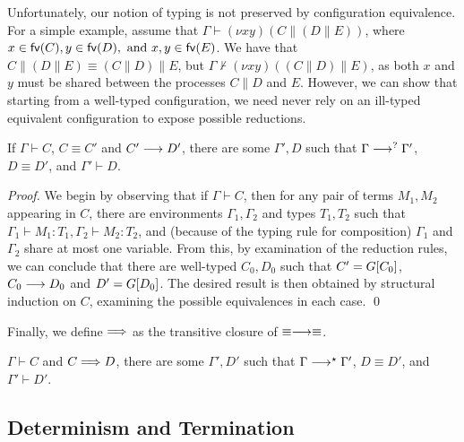 \documentclass[oribibl,orivec,envcountsame]{llncs}
\begin{document}
Unfortunately, our notion of typing is not preserved by configuration equivalence.  For a simple
example, assume that $\Gamma \vdash (\nu x y)(C \parallel (D \parallel E))$, where $x \in \mathsf{fv}(C), y
\in \mathsf{fv}(D), \text{ and } x,y \in \mathsf{fv}(E)$.  We have that $C \parallel (D \parallel E) \equiv
(C \parallel D) \parallel E$, but $\Gamma \nvdash (\nu x y)((C \parallel D) \parallel E)$, as both
$x$ and $y$ must be shared between the processes $C \parallel D$ and $E$.  However, we can show that
starting from a well-typed configuration, we need never rely on an ill-typed equivalent
configuration to expose possible reductions.
%
\begin{theorem}\label{thm:preservation-equiv}
  If $\Gamma \vdash C$, $C \equiv C'$ and $C' \longrightarrow D'$, there are some $\Gamma',D$ such that
  $\Gamma \longrightarrow^? \Gamma'$, $D \equiv D'$, and $\Gamma' \vdash D$.
\end{theorem}
%
\begin{proof}
  We begin by observing that if $\Gamma \vdash C$, then for any pair of terms $M_1, M_2$ appearing
  in $C$, there are environments $\Gamma_1,\Gamma_2$ and types $T_1,T_2$ such that $\Gamma_1 \vdash
  M_1 : T_1,\Gamma_2 \vdash M_2 : T_2$, and (because of the typing rule for composition) $\Gamma_1$
  and $\Gamma_2$ share at most one variable.  From this, by examination of the reduction rules, we
  can conclude that there are well-typed $C_0,D_0$ such that $C' = G[C_0]$, $C_0 \longrightarrow D_0$ and
  $D' = G[D_0]$.  The desired result is then obtained by structural induction on $C$, examining
  the possible equivalences in each case. \qed
\end{proof}
%
Finally, we define $\Longrightarrow$ as the transitive closure of $\equiv\longrightarrow\equiv$.
%
\begin{corollary}
  $\Gamma \vdash C$ and $C \Longrightarrow D$, there are some $\Gamma',D'$ such that $\Gamma
  \longrightarrow^\star \Gamma'$, $D \equiv D'$, and $\Gamma' \vdash D'$.
\end{corollary}

\subsection{Determinism and Termination}\label{sec:determinism}
\end{document}
